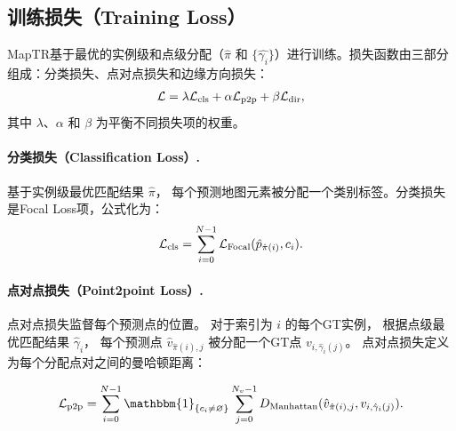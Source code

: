 \documentclass{article} %
\newcommand{\oldnew}[2]{#2}
\begin{document}
\subsection{训练损失（Training Loss）
\label{sec:e2e-training}}
MapTR基于最优的实例级和点级分配（$\hat{\pi}$ 和 $\{\hat{\gamma_i}\}$）进行训练。损失函数由三部分组成：分类损失、点对点损失和边缘方向损失：
\begin{equation}
\begin{gathered}
   \mathcal{L} = \lambda \mathcal{L}_{\rm{cls}} + \alpha \mathcal{L}_{\rm{p2p}} + \beta \mathcal{L}_{\rm{dir}},
\end{gathered}    
\end{equation}
其中 $\lambda$、$\alpha$ 和 $\beta$ 为平衡不同损失项的权重。


\paragraph{分类损失（Classification Loss）.}
基于实例级最优匹配结果 $\hat{\pi}$，
每个预测地图元素被分配一个类别标签\oldnew{(or 'no object' $\varnothing$)}{}。分类损失是Focal Loss项，公式化为：
\begin{equation}
\begin{gathered}
\mathcal{L}_{\rm{cls}} = \sum_{i=0}^{N-1} \mathcal{L}_{\rm{Focal}}(\hat{p}_{\hat{\pi}(i)}, c_i).
\end{gathered}
\end{equation}



\paragraph{点对点损失（Point2point Loss）.}
点对点损失监督每个预测点的位置。
对于索引为 $i$ 的每个GT实例，
根据点级最优匹配结果 $\hat{\gamma}_i$，
每个预测点 $\hat{v}_{\hat{\pi}(i),j}$ 被分配一个GT点 $v_{i, \hat{\gamma}_i(j)}$。
点对点损失定义为每个分配点对之间的曼哈顿距离：

\begin{equation}
\begin{gathered}
    \mathcal{L}_{\rm{p2p}} = \sum_{i=0}^{N-1}   \mathbbm{1}_{\{c_i\neq \varnothing\}}    \sum_{j=0}^{N_v-1} D_{\rm {Manhattan}}(\hat{v}_{\hat{\pi}(i),j},  v_{i, \hat{\gamma}_i(j)}).
\end{gathered}    
\end{equation}
\end{document}
